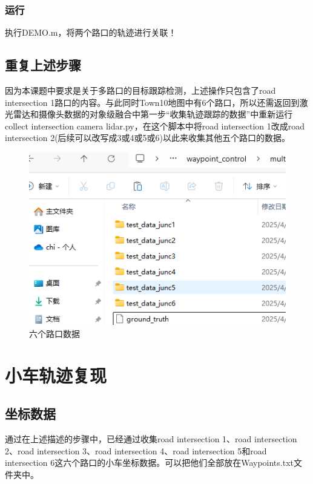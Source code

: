 \subsubsection{运行}
执行DEMO.m，将两个路口的轨迹进行关联！
\subsection{重复上述步骤}
因为本课题中要求是关于多路口的目标跟踪检测，上述操作只包含了road intersection 1路口的内容。与此同时Town10地图中有6个路口，所以还需返回到激光雷达和摄像头数据的对象级融合中第一步“收集轨迹跟踪的数据”中重新运行collect intersection camera lidar.py，在这个脚本中将road intersection 1改成road intersection 2(后续可以改写成3或4或5或6)以此来收集其他五个路口的数据。




\begin{figure}[htbp] %
	\centering
	\includegraphics[width=1\textwidth]{p16} %
	\caption{六个路口数据} %
	\label{fig:p16} %
\end{figure}






\section{小车轨迹复现}
\subsection{坐标数据}
通过在上述描述的步骤中，已经通过收集road intersection 1、road intersection 2、road intersection 3、road intersection 4、road intersection 5和road intersection 6这六个路口的小车坐标数据。可以把他们全部放在Waypoints.txt文件夹中。


